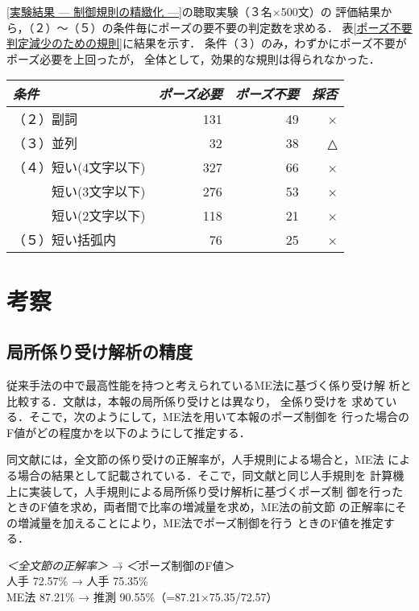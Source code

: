 \ref{実験結果 — 制御規則の精緻化 —}の聴取実験（３名×500文）の
評価結果から，（２）〜（５）の条件毎にポーズの要不要の判定数を求める．
表\ref{ポーズ不要判定減少のための規則}に結果を示す．
条件（３）のみ，わずかにポーズ不要がポーズ必要を上回ったが，
全体として，効果的な規則は得られなかった．

\begin{table*}
\caption{ポーズ不要判定減少のための規則}
\label{ポーズ不要判定減少のための規則}
\begin{center}
\begin{tabular}{lrrr} \hline
   {\it 条件} &	{\it ポーズ必要} & {\it ポーズ不要} & {\it 採否} \\ \hline
   （２）副詞   & 131 &   49 &  ×\\
   （３）並列   & 32 &  38 &   △ \\
   （４）短い(4文字以下)   & 327 &  66 & × \\
   　　　短い(3文字以下)   & 276 &  53 & × \\
   　　　短い(2文字以下)   & 118 &  21 & × \\
   （５）短い括弧内 & 76 &  25 &  ×\\ \hline
\end{tabular}
\end{center}
\end{table*}

\section{考察}

\subsection{局所係り受け解析の精度}

   従来手法の中で最高性能を持つと考えられているME法に基づく係り受け解
   析と比較する．文献\cite{内元1999}は，本報の局所係り受けとは異なり，
   全係り受けを
   求めている．そこで，次のようにして，ME法を用いて本報のポーズ制御を
   行った場合のF値がどの程度かを以下のようにして推定する．

   同文献には，全文節の係り受けの正解率が，人手規則による場合と，ME法
   による場合の結果として記載されている．そこで，同文献と同じ人手規則を
   計算機上に実装して，人手規則による局所係り受け解析に基づくポーズ制
   御を行ったときのF値を求め，両者間で比率の増減量を求め，ME法の前文節
   の正解率にその増減量を加えることにより，ME法でポーズ制御を行う
   ときのF値を推定する．

\begin{tabbing}
	{\it ＜全文節の正解率＞} \= {→} \= {＜ポーズ制御のF値＞} \\
	人手 72.57\% \> → \> 人手 75.35\%\\
	ME法 87.21\% \> → \> 推測 90.55\%（=87.21×75.35/72.57）\\
\end{tabbing}

